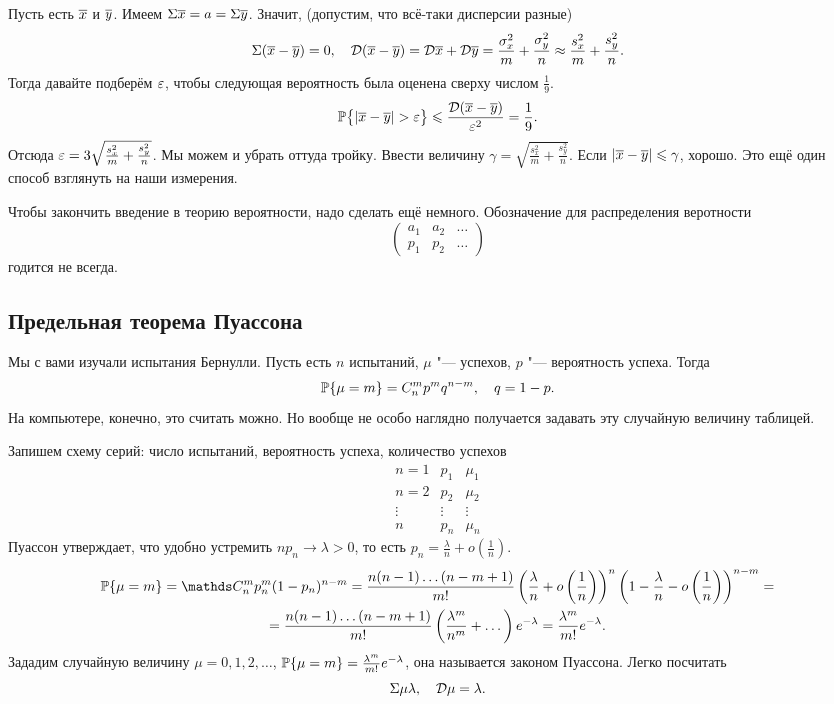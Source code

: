Пусть есть $\ol x$ и $\ol y$. Имеем $\E\ol x = a = \E \ol y$. Значит, (допустим, что всё-таки дисперсии разные)
\[
  \E(\ol x - \ol y) = 0,\quad \D(\ol x - \ol y) = \D\ol x + \D\ol y = \frac{\sigma_x^2}m + \frac{\sigma_y^2}n\approx \frac{s_x^2}m + \frac{s_y^2}n.
\]
Тогда давайте подберём $\e$, чтобы следующая вероятность была оценена сверху числом $\frac19$.
\[
  \P\big\{ |\ol x- \ol y|>\e\big\} \le \frac{\D(\ol x- \ol y)}{\e^2}= \frac19.
\]
Отсюда $\e = 3\sqrt{\frac{s_x^2}m + \frac{s_y^2}n}$. Мы можем и убрать оттуда тройку. Ввести величину $\gamma = \sqrt{\frac{s_x^2}m + \frac{s_y^2}n}$. Если $|\ol x - \ol y|\le \gamma$, хорошо. Это ещё один способ взглянуть на наши измерения.

Чтобы закончить введение в теорию вероятности, надо сделать ещё немного. Обозначение для распределения веротности
\[
  \begin{pmatrix}
    a_1 & a_2 &\dots\\
    p_1 & p_2 &\dots
  \end{pmatrix}
\]
годится не всегда.

\subsection{Предельная теорема Пуассона}
Мы с вами изучали испытания Бернулли. Пусть есть $n$ испытаний, $\mu$ "--- успехов, $p$ "--- вероятность успеха. Тогда
\[
  \P\{\mu = m\} = C_n^m p^m q^{n-m},\quad q = 1-p.
\]
На компьютере, конечно, это считать можно. Но вообще не особо наглядно получается задавать эту случайную величину таблицей.

Запишем схему серий: число испытаний, вероятность успеха, количество успехов
\[
\begin{matrix}
  n=1 & p_1 & \mu_1\\
  n=2 & p_2 & \mu_2\\
  \vdots & \vdots & \vdots\\
  n & p_n & \mu_n
\end{matrix}
\]
Пуассон утверждает, что удобно устремить $n p_n\to \lambda>0$, то есть $p_n = \frac\lambda n + o\left(\frac1n\right)$.
\begin{multline*}
  \P\{\mu = m\} = \C_n^m p_n^m(1-p_n)^{n-m} = 
  \frac{n(n-1)\dots(n-m+1)}{m!}\left(\frac\lambda n + o\left(\frac1n\right)\right)^n\left(1 - \frac\lambda n - o\left(\frac1n\right)\right)^{n-m} = \\=
  \frac{n(n-1)\dots(n-m+1)}{m!}\left(\frac{\lambda^m}{n^m} + \dots\right)e^{-\lambda} = \frac{\lambda^m}{m!}e^{-\lambda}.
\end{multline*}
Зададим случайную величину $\mu=0,1,2,\dots$, $\P\{\mu=m\} = \frac{\lambda^m}{m!}e^{-\lambda}$, она называется законом Пуассона. Легко посчитать
\[
  \E\mu \lambda,\quad \D\mu = \lambda.
\]


